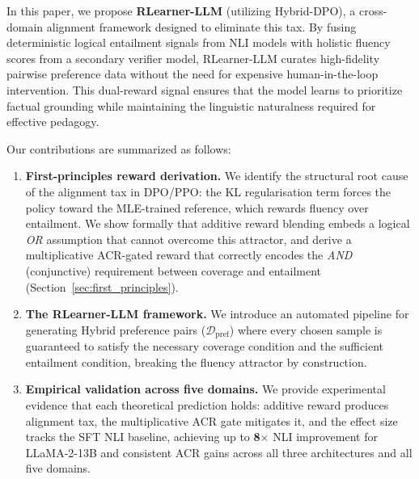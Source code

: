In this paper, we propose \textbf{RLearner-LLM} (utilizing Hybrid-DPO), a cross-domain alignment framework designed to eliminate this tax. By fusing deterministic logical entailment signals from NLI models with holistic fluency scores from a secondary verifier model, RLearner-LLM curates high-fidelity pairwise preference data without the need for expensive human-in-the-loop intervention. This dual-reward signal ensures that the model learns to prioritize factual grounding while maintaining the linguistic naturalness required for effective pedagogy.

Our contributions are summarized as follows:
\begin{enumerate}
    \item \textbf{First-principles reward derivation.} We identify the structural root cause of the alignment tax in DPO/PPO: the KL regularisation term forces the policy toward the MLE-trained reference, which rewards fluency over entailment. We show formally that additive reward blending embeds a logical \emph{OR} assumption that cannot overcome this attractor, and derive a multiplicative ACR-gated reward that correctly encodes the \emph{AND} (conjunctive) requirement between coverage and entailment (Section~\ref{sec:first_principles}).
    \item \textbf{The RLearner-LLM framework.} We introduce an automated pipeline for generating Hybrid preference pairs ($\mathcal{D}_\text{pref}$) where every chosen sample is guaranteed to satisfy the necessary coverage condition and the sufficient entailment condition, breaking the fluency attractor by construction.
    \item \textbf{Empirical validation across five domains.} We provide experimental evidence that each theoretical prediction holds: additive reward produces alignment tax, the multiplicative ACR gate mitigates it, and the effect size tracks the SFT NLI baseline, achieving up to \textbf{8$\times$} NLI improvement for LLaMA-2-13B and consistent ACR gains across all three architectures and all five domains.
\end{enumerate}
